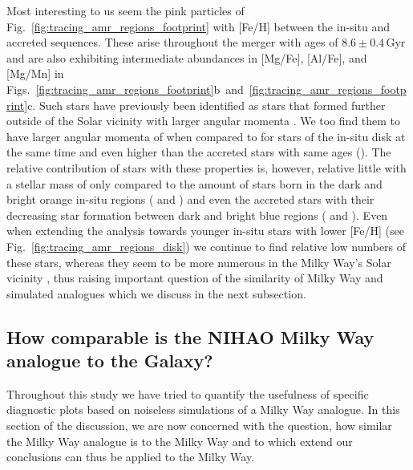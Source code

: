 \documentclass[fleqn,usenatbib]{mnras}
\begin{document}
Most interesting to us seem the pink particles of Fig.~\ref{fig:tracing_amr_regions_footprint} with [Fe/H] between the in-situ and accreted sequences. These arise throughout the merger with ages of $8.6\pm0.4\,\mathrm{Gyr}$ and are also exhibiting intermediate abundances in [Mg/Fe], [Al/Fe], and [Mg/Mn] in Figs.~\ref{fig:tracing_amr_regions_footprint}b~and~\ref{fig:tracing_amr_regions_footprint}c. Such stars have previously been identified as stars that formed further outside of the Solar vicinity  with larger angular momenta \citep[e.g.][]{Haywood2008b, Haywood2013, Buder2019}. We too find them to have larger angular momenta of  when compared to  for stars of the in-situ disk at the same time and even higher than the accreted stars with same ages (). The relative contribution of stars with these properties is, however, relative little with a stellar mass of only  compared to the amount of stars born in the dark and bright orange in-situ regions ( and ) and even the accreted stars with their decreasing star formation between dark and bright blue regions ( and ). Even when extending the analysis towards younger in-situ stars with lower [Fe/H] (see Fig.~\ref{fig:tracing_amr_regions_disk}) we continue to find relative low numbers of these stars, whereas they seem to be more numerous in the Milky Way's Solar vicinity \citep{Haywood2013, Hayden2015, Buder2019}, thus raising important question of the similarity of Milky Way and simulated analogues which we discuss in the next subsection.

\subsection{How comparable is the NIHAO Milky Way analogue to the Galaxy?} \label{sec:discussion_how_comparable_are_nihao_and_milkyway}

Throughout this study we have tried to quantify the usefulness of specific diagnostic plots based on noiseless simulations of a Milky Way analogue. In this section of the discussion, we are now concerned with the question, how similar the Milky Way analogue is to the Milky Way and to which extend our conclusions can thus be applied to the Milky Way.
\end{document}
